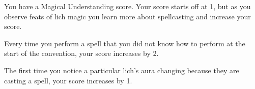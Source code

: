 \documentclass[green]{Sel}
\begin{document}
\name{\gSollersMagicalUnderstanding{}}

You have a Magical Understanding score. Your score starts off at 1, but as you observe feats of lich magic you learn more about spellcasting and increase your score.

Every time you perform a spell that you did not know how to perform at the start of the convention, your score increases by 2.

The first time you notice a particular lich’s aura changing because they are casting a spell, your score increases by 1.
\end{document}
